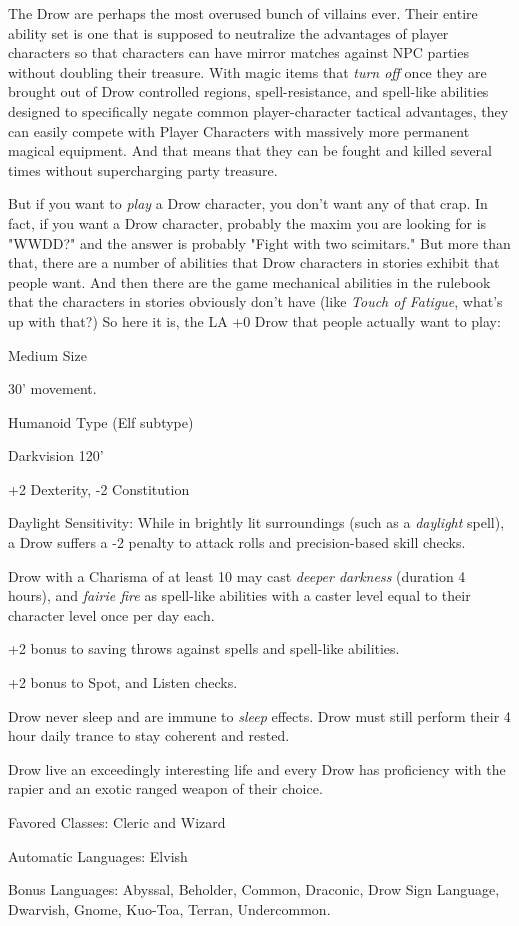 
The Drow are perhaps the most overused bunch of villains ever. Their entire ability set is one that is supposed to neutralize the advantages of player characters so that characters can have mirror matches against NPC parties without doubling their treasure. With magic items that \textit{turn off} once they are brought out of Drow controlled regions, spell-resistance, and spell-like abilities designed to specifically negate common player-character tactical advantages, they can easily compete with Player Characters with massively more permanent magical equipment. And that means that they can be fought and killed several times without supercharging party treasure.

But if you want to \textit{play} a Drow character, you don't want any of that crap. In fact, if you want a Drow character, probably the maxim you are looking for is "WWDD?" and the answer is probably "Fight with two scimitars." But more than that, there are a number of abilities that Drow characters in stories exhibit that people want. And then there are the game mechanical abilities in the rulebook that the characters in stories obviously don't have (like \textit{Touch of Fatigue}, what's up with that?) So here it is, the LA +0 Drow that people actually want to play:

\begin{itemize*}
\item Medium Size
\item 30' movement.
\item Humanoid Type (Elf subtype)
\item Darkvision 120'
\item +2 Dexterity, -2 Constitution
\item Daylight Sensitivity: While in brightly lit surroundings (such as a \textit{daylight} spell), a Drow suffers a -2 penalty to attack rolls and precision-based skill checks.
\item Drow with a Charisma of at least 10 may cast \textit{deeper darkness} (duration 4 hours), and \textit{fairie fire} as spell-like abilities with a caster level equal to their character level once per day each.
\item +2 bonus to saving throws against spells and spell-like abilities.
\item +2 bonus to Spot, and Listen checks.
\item Drow never sleep and are immune to \textit{sleep} effects. Drow must still 
perform their 4 hour daily trance to stay coherent and rested.
\item Drow live an exceedingly interesting life and every Drow has proficiency 
with the rapier and an exotic ranged weapon of their choice.
\item Favored Classes: Cleric and Wizard
\item Automatic Languages: Elvish
\item Bonus Languages: Abyssal, Beholder, Common, Draconic, Drow Sign Language, Dwarvish, Gnome, Kuo-Toa, Terran, Undercommon. 
\end{itemize*}
